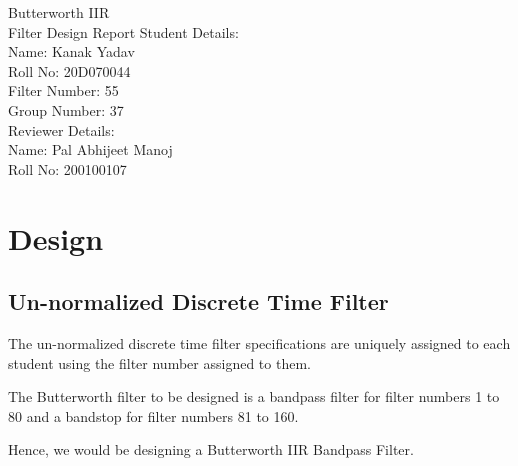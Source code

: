 \documentclass[12pt]{article}
\begin{document}
\begin{titlepage}
    \begin{center}
        \huge
        Butterworth IIR\\Filter Design Report
        \vfill
        \large
        Student Details:\\\vspace{3pt}
        Name: Kanak Yadav\\\vspace{3pt}
        Roll No: 20D070044\\\vspace{3pt}
        Filter Number: 55\\\vspace{3pt}
        Group Number: 37\\\vspace{60pt}
        Reviewer Details:\\\vspace{3pt}
        Name: Pal Abhijeet Manoj\\\vspace{3pt}
        Roll No: 200100107
        \vfill
    \end{center}
\end{titlepage}

\section{Design}
\subsection{Un-normalized Discrete Time Filter}
The un-normalized discrete time filter specifications are uniquely assigned to each student using the filter number assigned to them.

The Butterworth filter to be designed is a bandpass filter for filter numbers 1 to 80 and a bandstop for filter numbers 81 to 160.

Hence, we would be designing a Butterworth IIR Bandpass Filter.
\end{document}

